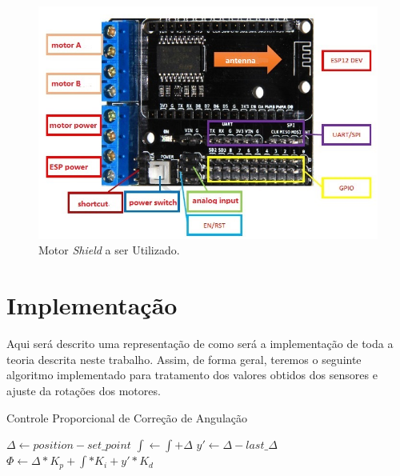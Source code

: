 \documentclass[portugues, brazil, a4paper,12pt]{article}
\begin{document}
		\begin{figure}[H]
			\centering
			\includegraphics[width=0.9\linewidth]{img/eq-motor_shield.jpg}
			\caption{Motor \textit{Shield} a ser Utilizado.}
			\label{fig:eq-motor_shield}
		\end{figure}
		

\section{Implementação} \label{sec:implementacao}
	Aqui será descrito uma representação de como será a implementação de toda a teoria descrita neste trabalho. Assim, de forma geral, teremos o seguinte algoritmo implementado para tratamento dos valores obtidos dos sensores e ajuste da rotações dos motores. 
	
	\begin{algorithm}[H]
		\caption{Controle Proporcional de Correção de Angulação}\label{euclid}
		\begin{algorithmic}[1]
				\State $ \Delta \gets position - set\_point$
				\State $ \int \gets \int + \Delta$
				\State $ y' \gets \Delta - last\_\Delta $
				\State $ \Phi \gets \Delta * K_p + \int * K_i + y' * K_d $
			\EndProcedure
		\end{algorithmic}
	\end{algorithm}
\end{document}
